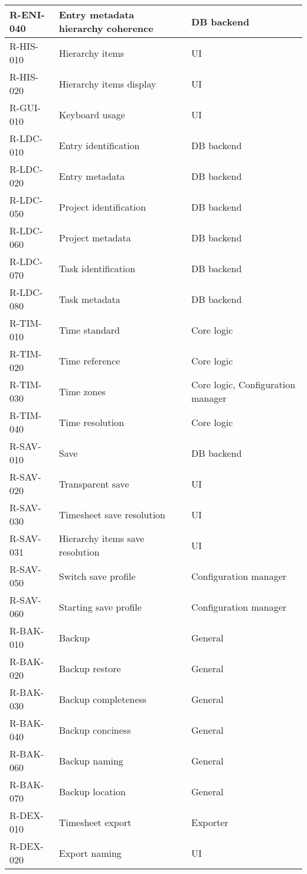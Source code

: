 \begin{longtable}{| p{} |
                    p{} |
                    p{} |}
  R-ENI-040 & Entry metadata hierarchy coherence & DB backend \\ \hline
  R-HIS-010 & Hierarchy items & UI \\ \hline
  R-HIS-020 & Hierarchy items display & UI \\ \hline
  R-GUI-010 & Keyboard usage & UI \\ \hline
  R-LDC-010 & Entry identification & DB backend \\ \hline
  R-LDC-020 & Entry metadata & DB backend \\ \hline
  R-LDC-050 & Project identification & DB backend \\ \hline
  R-LDC-060 & Project metadata & DB backend \\ \hline
  R-LDC-070 & Task identification & DB backend \\ \hline
  R-LDC-080 & Task metadata & DB backend \\ \hline
  R-TIM-010 & Time standard & Core logic \\ \hline
  R-TIM-020 & Time reference & Core logic \\ \hline
  R-TIM-030 & Time zones & Core logic, Configuration manager \\ \hline
  R-TIM-040 & Time resolution & Core logic \\ \hline
  R-SAV-010 & Save & DB backend \\ \hline
  R-SAV-020 & Transparent save & UI \\ \hline
  R-SAV-030 & Timesheet save resolution & UI \\ \hline
  R-SAV-031 & Hierarchy items save resolution & UI \\ \hline
  R-SAV-050 & Switch save profile & Configuration manager \\ \hline
  R-SAV-060 & Starting save profile & Configuration manager \\ \hline
  R-BAK-010 & Backup & General \\ \hline
  R-BAK-020 & Backup restore & General \\ \hline
  R-BAK-030 & Backup completeness & General \\ \hline
  R-BAK-040 & Backup conciness & General \\ \hline
  R-BAK-060 & Backup naming & General \\ \hline
  R-BAK-070 & Backup location & General \\ \hline
  R-DEX-010 & Timesheet export & Exporter \\ \hline
  R-DEX-020 & Export naming & UI \\ \hline

\end{longtable}
